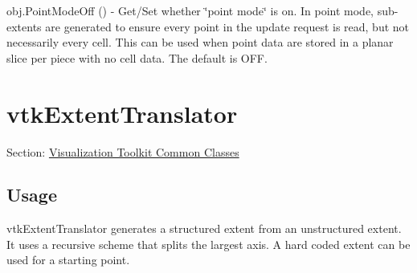 \begin{DoxyItemize}
\item {\ttfamily obj.\-Point\-Mode\-Off ()} -\/ Get/\-Set whether \char`\"{}point mode\char`\"{} is on. In point mode, sub-\/extents are generated to ensure every point in the update request is read, but not necessarily every cell. This can be used when point data are stored in a planar slice per piece with no cell data. The default is O\-F\-F.  
\end{DoxyItemize}\hypertarget{vtkcommon_vtkextenttranslator}{}\section{vtk\-Extent\-Translator}\label{vtkcommon_vtkextenttranslator}
Section\-: \hyperlink{sec_vtkcommon}{Visualization Toolkit Common Classes} \hypertarget{vtkwidgets_vtkxyplotwidget_Usage}{}\subsection{Usage}\label{vtkwidgets_vtkxyplotwidget_Usage}
vtk\-Extent\-Translator generates a structured extent from an unstructured extent. It uses a recursive scheme that splits the largest axis. A hard coded extent can be used for a starting point.

